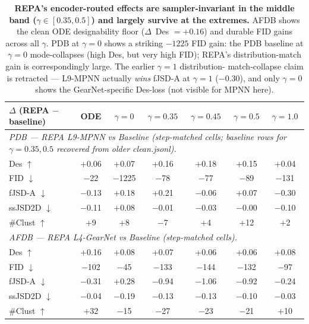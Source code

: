 \documentclass[11pt,a4paper]{article}
\newcommand{\gd}[1]{\cellcolor{green!20}#1}
\newcommand{\rd}[1]{\cellcolor{red!15}#1}
\begin{document}
\begin{table}[H]
\centering
\small
\setlength{\tabcolsep}{6pt}
\begin{tabular}{l|cccccc}
\toprule
$\Delta$ (REPA $-$ baseline) & ODE & $\gamma=0$ & $\gamma=0.35$ & $\gamma=0.45$ & $\gamma=0.5$ & $\gamma=1.0$ \\
\midrule
\multicolumn{7}{l}{\textit{PDB --- REPA L9-MPNN vs Baseline (step-matched cells; baseline rows for $\gamma{=}0.35,0.5$ recovered from older clean.jsonl).}}\\
Des $\uparrow$         & \gd{+0.06} & \gd{+0.07} & \gd{+0.16} & \gd{+0.18} & \gd{+0.15} & \gd{+0.04} \\
FID $\downarrow$        & \gd{$-$22}   & \gd{$-$1225} & \gd{$-$78}   & \gd{$-$77}   & \gd{$-$89}   & \gd{$-$131} \\
fJSD-A $\downarrow$     & \gd{$-$0.13} & \rd{+0.18} & \rd{+0.21} & \gd{$-$0.06} & \rd{+0.07} & \gd{$-$0.30} \\
ssJSD2D $\downarrow$    & \gd{$-$0.11} & \rd{+0.08} & \gd{$-$0.01} & \gd{$-$0.03} & \gd{$-$0.00} & \gd{$-$0.10} \\
\#Clust $\uparrow$      & \gd{+9}    & \gd{+8}    & \rd{$-$7}    & \gd{+4}    & \gd{+12}   & \gd{+2}  \\
\midrule
\multicolumn{7}{l}{\textit{AFDB --- REPA L4-GearNet vs Baseline (step-matched cells).}}\\
Des $\uparrow$          & \gd{+0.16} & \gd{+0.08} & \gd{+0.07} & \gd{+0.06} & \gd{+0.06} & \gd{+0.08} \\
FID $\downarrow$         & \gd{$-$102}  & \gd{$-$45}   & \gd{$-$133}  & \gd{$-$144}  & \gd{$-$132}  & \gd{$-$97} \\
fJSD-A $\downarrow$      & \gd{$-$0.31} & \rd{+0.28} & \gd{$-$0.94} & \gd{$-$1.06} & \gd{$-$0.92} & \gd{$-$0.24} \\
ssJSD2D $\downarrow$     & \gd{$-$0.04} & \gd{$-$0.19} & \gd{$-$0.13} & \gd{$-$0.13} & \gd{$-$0.10} & \gd{$-$0.03} \\
\#Clust $\uparrow$       & \gd{+32}   & \rd{$-$15}   & \rd{$-$27}   & \rd{$-$23}   & \rd{$-$21}   & \gd{+10} \\
\bottomrule
\end{tabular}
\caption{\textbf{REPA's encoder-routed effects are sampler-invariant in
the middle band ($\gamma{\in}[0.35, 0.5]$) and largely survive at the
extremes.} AFDB shows the clean ODE designability floor ($\Delta$~Des
$=+0.16$) and durable FID gains across all $\gamma$. PDB at $\gamma{=}0$
shows a striking $-1225$ FID gain: the PDB baseline at $\gamma{=}0$
mode-collapses (high Des, but very high FID); REPA's distribution-match
gain is correspondingly large. The earlier $\gamma{=}1$ distribution-
match-collapse claim is retracted --- L9-MPNN actually \emph{wins}
fJSD-A at $\gamma{=}1$ ($-0.30$), and only $\gamma{=}0$ shows the
GearNet-specific Des-loss (not visible for MPNN here).}
\end{table}
\end{document}
